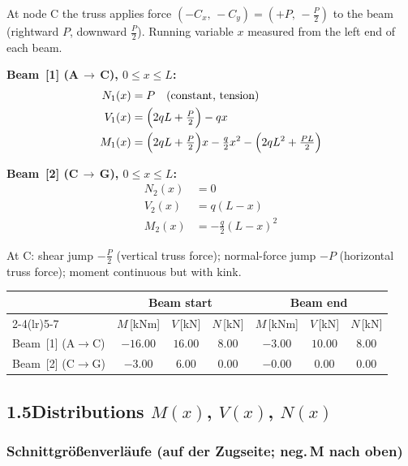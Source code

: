 \documentclass[a4paper,11pt]{article}
\begin{document}
At node C the truss applies force $(-C_x,\,-C_y) = (+P,\,-\tfrac{P}{2})$
to the beam (rightward $P$, downward $\tfrac{P}{2}$).
Running variable $x$ measured from the left end of each beam.

\textbf{Beam~[1] (A\,$\to$\,C), $0 \le x \le L$:}
\begin{align*}
  N_1(x) &= P \quad\text{(constant, tension)} \\
  V_1(x) &= \Bigl(2qL + \tfrac{P}{2}\Bigr) - qx \\
  M_1(x) &= \Bigl(2qL + \tfrac{P}{2}\Bigr)x - \tfrac{q}{2}x^2
            - \Bigl(2qL^2 + \tfrac{PL}{2}\Bigr)
\end{align*}

\textbf{Beam~[2] (C\,$\to$\,G), $0 \le x \le L$:}
\begin{align*}
  N_2(x) &= 0 \\
  V_2(x) &= q(L - x) \\
  M_2(x) &= -\tfrac{q}{2}(L - x)^2
\end{align*}

At C: shear jump $-\tfrac{P}{2}$ (vertical truss force);
normal-force jump $-P$ (horizontal truss force); moment continuous but with kink.

\medskip
\begin{center}
\begin{tabular}{l cccccc}
\toprule
 & \multicolumn{3}{c}{\textbf{Beam start}} & \multicolumn{3}{c}{\textbf{Beam end}} \\
\cmidrule(lr){2-4}\cmidrule(lr){5-7}
 & $M$\,[kNm] & $V$\,[kN] & $N$\,[kN]
 & $M$\,[kNm] & $V$\,[kN] & $N$\,[kN] \\
\midrule
Beam~[1] (A$\to$C) & $-16.00$ & $16.00$ & $8.00$ & $-3.00$ & $10.00$ & $8.00$ \\[3pt]
Beam~[2] (C$\to$G) & $-3.00$ & $6.00$ & $0.00$ & $-0.00$ & $0.00$ & $0.00$ \\
\bottomrule
\end{tabular}
\end{center}

\subsection*{1.5\quad Distributions $M(x)$, $V(x)$, $N(x)$}


\subsubsection*{Schnittgrößenverläufe (auf der Zugseite; neg.\,M nach oben)}
\end{document}
